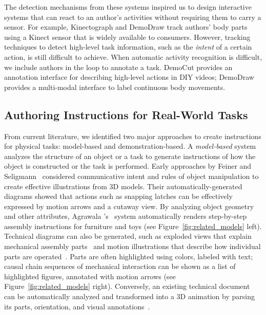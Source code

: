 The detection mechanisms from these systems inspired us to design interactive systems that can react to an author's activities without requiring them to carry  a sensor. For example, Kinectograph and DemoDraw track authors' body parts using a Kinect sensor that is widely available to consumers.
%
However, tracking techniques to detect high-level task information, such as the \emph{intent} of a certain action, is still difficult to achieve. When automatic activity recognition is difficult, we include authors in the loop to annotate a task. DemoCut provides an annotation interface for describing high-level actions in DIY videos; DemoDraw provides a multi-modal interface to label continuous body movements.



\subsection{Authoring Instructions for Real-World Tasks}

From current literature, we identified two major approaches to create instructions for physical tasks: model-based and demonstration-based.
%
A \emph{model-based} system analyzes the structure of an object or a task to generate instructions of how the object is constructed or the task is performed.
%
Early approaches by Feiner and Seligmann~\cite{feiner:1985:AEA:1299975.1300548,Seligmann:1991:AGI:127719.122732} considered communicative intent and rules of object manipulation to create effective illustrations from 3D models. Their automatically-generated diagrams showed that actions such as snapping latches can be effectively expressed by motion arrows and a cutaway view.
%
By analyzing object geometry and other attributes, Agrawala \ea{}'s~\cite{agrawala2003designing} system automatically renders step-by-step assembly instructions for furniture and toys (see Figure~\ref{fig:related_models} left).
%
Technical diagrams can also be generated, such as exploded views that explain mechanical assembly parts~\cite{li2008automated} and motion illustrations that describe how individual parts are operated~\cite{mitra2010illustrating}. Parts are often highlighted using colors, labeled with text; causal chain sequences of mechanical interaction can be shown as a list of highlighted figures, annotated with motion arrows (see Figure~\ref{fig:related_models} right).
%
Conversely, an existing technical document can be automatically analyzed and transformed into a 3D animation by parsing its parts, orientation, and visual annotations~\cite{Mohr:2015:RTD:2702123.2702490}.

